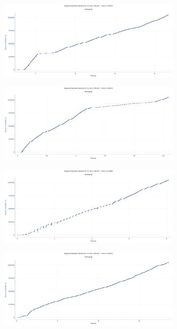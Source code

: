 \documentclass[
    pdftex,
    12pt,
    parskip=half,
    a4paper
]{scrartcl}
\begin{document}
\begin{figure}
	\begin{subfigure}{0.5\textwidth}
		\includegraphics[width=1\textwidth]{../1/wireshark/variable1.pdf}
	\end{subfigure}
	\begin{subfigure}{0.5\textwidth}
		\includegraphics[width=1\textwidth]{../1/wireshark/variable2.pdf}
	\end{subfigure}
	\begin{subfigure}{0.5\textwidth}
		\includegraphics[width=1\textwidth]{../1/wireshark/variable3.pdf}
	\end{subfigure}
	\begin{subfigure}{0.5\textwidth}
		\includegraphics[width=1\textwidth]{../1/wireshark/variable4.pdf}

\end{subfigure}
\end{figure}
\end{document}
